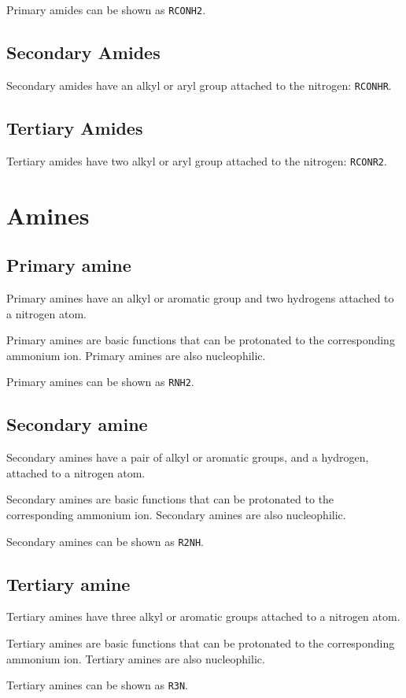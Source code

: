 \documentclass[oneside]{book} %
\theoremstyle{plain}
\begin{document}
Primary amides can be shown as \texttt{RCONH2}.

\subsection{Secondary Amides}
Secondary amides have an alkyl or aryl group attached to the nitrogen:
\texttt{RCONHR}.

\subsection{Tertiary Amides}
Tertiary amides have two alkyl or aryl group attached to the nitrogen:
\texttt{RCONR2}.

\section{Amines}
\subsection{Primary amine}
Primary amines have an alkyl or aromatic group and two hydrogens attached to a
nitrogen atom.

Primary amines are basic functions that can be protonated to the corresponding
ammonium ion.
Primary amines are also nucleophilic.

Primary amines can be shown as \texttt{RNH2}.

\subsection{Secondary amine}
Secondary amines have a pair of alkyl or aromatic groups, and a hydrogen,
attached to a nitrogen atom.

Secondary amines are basic functions that can be protonated to the corresponding
ammonium ion.
Secondary amines are also nucleophilic.

Secondary amines can be shown as \texttt{R2NH}.

\subsection{Tertiary amine}
Tertiary amines have three alkyl or aromatic groups attached to a nitrogen atom.

Tertiary amines are basic functions that can be protonated to the corresponding
ammonium ion.
Tertiary amines are also nucleophilic.

Tertiary amines can be shown as \texttt{R3N}.
\end{document}
